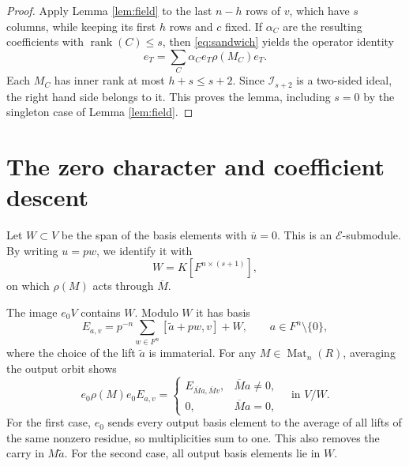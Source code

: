 \documentclass[11pt]{article}
\theoremstyle{remark}\newtheorem{remark}[theorem]{Remark}
\newcommand{\Mat}{\operatorname{Mat}}
\newcommand{\rk}{\operatorname{rank}}
\begin{document}
\begin{proof}
Apply Lemma \ref{lem:field} to the last $n-h$ rows of $v$, which have $s$ columns, while keeping its first $h$ rows and $c$ fixed. If $\alpha_C$ are the resulting coefficients with $\rk(C)\le s$, then \eqref{eq:sandwich} yields the operator identity
\begin{equation}\label{eq:nonzero}
 e_T=\sum_C\alpha_Ce_T\rho(M_C)e_T.
\end{equation}
Each $M_C$ has inner rank at most $h+s\le s+2$. Since $\mathcal I_{s+2}$ is a two-sided ideal, the right hand side belongs to it. This proves the lemma, including $s=0$ by the singleton case of Lemma \ref{lem:field}.
\end{proof}

\section{The zero character and coefficient descent}

Let $W\subset V$ be the span of the basis elements with $\overline u=0$. This is an $\mathcal E$-submodule. By writing $u=pw$, we identify it with
\begin{equation}\label{eq:torsion}
 W=K[F^{n\times(s+1)}],
\end{equation}
on which $\rho(M)$ acts through $\overline M$.

The image $e_0V$ contains $W$. Modulo $W$ it has basis
\begin{equation}\label{eq:zero-basis}
 E_{a,v}=p^{-n}\sum_{w\in F^n}[\widetilde a+pw,v]+W,
 \qquad a\in F^n\setminus\{0\},
\end{equation}
where the choice of the lift $\widetilde a$ is immaterial. For any $M\in\Mat_n(R)$, averaging the output orbit shows
\begin{equation}\label{eq:zero-action}
 e_0\rho(M)e_0E_{a,v}=
 \begin{cases}
 E_{\overline Ma,\overline Mv},&\overline Ma\ne0,\\
 0,&\overline Ma=0,
 \end{cases}
 \quad\text{in }V/W.
\end{equation}
For the first case, $e_0$ sends every output basis element to the average of all lifts of the same nonzero residue, so multiplicities sum to one. This also removes the carry in $M\widetilde a$. For the second case, all output basis elements lie in $W$.
\end{document}
